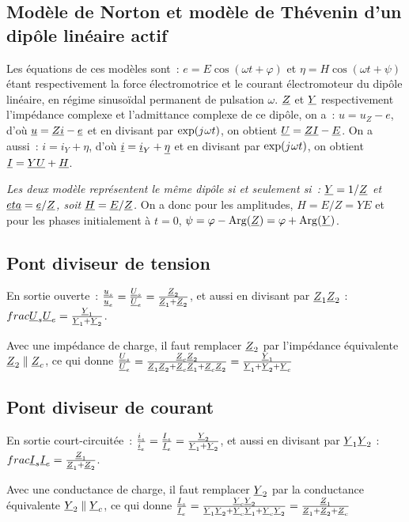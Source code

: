 \subsection{Modèle de Norton et modèle de Thévenin d'un dipôle linéaire  
actif}
Les équations de ces modèles sont~: \(e = E\cos(\omega t + \varphi)\) et 
\(\eta = H\cos(\omega t + \psi)\) étant respectivement la force 
électromotrice et le courant électromoteur du dipôle linéaire, en régime 
sinusoïdal permanent de pulsation \(\omega\). \(\underline{Z}\) et \(\underline{Y}\) 
respectivement l'impédance complexe et l'admittance complexe de ce 
dipôle, on a~: \(u = u_Z -e\), d'où \(\underline{u} = \underline{Z} \underline{i} -\underline{e}\) et 
en divisant par \(\exp({j\mkern1mu}\omega t)\), on obtient \(\underline{U} = \underline{Z} \underline{I} - 
\underline{E}\). On a aussi~: \(i = i_Y + \eta\), d'où \(\underline{i} = \underline{i}_Y + 
\underline{\eta}\) et en divisant par \(\exp({j\mkern1mu}\omega t)\), on obtient 
\(\underline{I} = \underline{Y} \underline{U} + \underline{H}\).

\emph{Les deux modèle représentent le même dipôle si et seulement si~: 
\(\underline{Y} = 1/\underline{Z}\) et \(\underline{eta} = \underline{e}/ \underline{Z}\), soit 
\(\underline{H} = \underline{E}/\underline{Z}\).} On a donc pour les amplitudes, 
\(H = E/Z = YE\) et pour les phases initialement à \(t=0\), \(\psi = 
\varphi - \operatorname{Arg}(\underline{Z}) = \varphi+\operatorname{Arg}(\underline{Y})\).
%
\subsection{Pont diviseur de tension}
En sortie ouverte~: \(\frac{\underline{u}_s}{\underline{u}_e} = \frac{\underline{U}_s}{\underline{U}_e} = 
\frac{\underline{Z}_2}{\underline{Z}_1+\underline{Z}_2}\), et aussi en divisant par \(\underline{Z}_1 \underline{Z}_2\) : 
\(frac{\underline{U}_s}{\underline{U}_e} = \frac{\underline{Y}_1}{\underline{Y}_1+\underline{Y}_2}\).

Avec une impédance de charge, il faut remplacer \(\underline{Z}_2\) par l'impédance 
équivalente \(\underline{Z}_2 \parallel \underline{Z}_c\), ce qui donne \(\frac{\underline{U}_s}{\underline{U}_e} 
= \frac{\underline{Z}_c \underline{Z}_2}{\underline{Z}_1\underline{Z}_2 + \underline{Z}_c\underline{Z}_1 + \underline{Z}_c\underline{Z}_2} = 
\frac{\underline{Y}_1}{\underline{Y}_1+\underline{Y}_2+\underline{Y}_c}\)
%
\subsection{Pont diviseur de courant}
En sortie court-circuitée~: \(\frac{\underline{i}_s}{\underline{i}_e} = \frac{\underline{I}_s}{\underline{I}_e} = 
\frac{\underline{Y}_2}{\underline{Y}_1+\underline{Y}_2}\), et aussi en divisant par \(\underline{Y}_1 \underline{Y}_2\) : 
\(frac{\underline{I}_s}{\underline{I}_e} = \frac{\underline{Z}_1}{\underline{Z}_1+\underline{Z}_2}\).

Avec une conductance de charge, il faut remplacer \(\underline{Y}_2\) par la 
conductance équivalente \(\underline{Y}_2 \parallel \underline{Y}_c\), ce qui donne 
\(\frac{\underline{I}_s}{\underline{I}_e} = \frac{\underline{Y}_c \underline{Y}_2}{\underline{Y}_1\underline{Y}_2 + \underline{Y}_c\underline{Y}_1 + 
\underline{Y}_c\underline{Y}_2} = \frac{\underline{Z}_1}{\underline{Z}_1+\underline{Z}_2+\underline{Z}_c}\)

